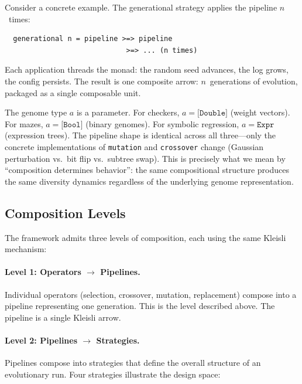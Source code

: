 \documentclass[sigconf,anonymous]{acmart}
\begin{document}
Consider a concrete example. The generational strategy applies the pipeline $n$~times:

\begin{verbatim}
  generational n = pipeline >=> pipeline
                             >=> ... (n times)
\end{verbatim}

\noindent Each application threads the monad: the random seed advances, the log grows, the config persists. The result is one composite arrow: $n$~generations of evolution, packaged as a single composable unit.

The genome type $a$ is a parameter. For checkers, $a = \texttt{[Double]}$ (weight vectors). For mazes, $a = \texttt{[Bool]}$ (binary genomes). For symbolic regression, $a = \texttt{Expr}$ (expression trees). The pipeline shape is identical across all three---only the concrete implementations of \texttt{mutation} and \texttt{crossover} change (Gaussian perturbation vs.\ bit flip vs.\ subtree swap). This is precisely what we mean by ``composition determines behavior'': the same compositional structure produces the same diversity dynamics regardless of the underlying genome representation.

\subsection{Composition Levels}

The framework admits three levels of composition, each using the same Kleisli mechanism:

\paragraph{Level 1: Operators $\to$ Pipelines.}
Individual operators (selection, crossover, mutation, replacement) compose into a pipeline representing one generation. This is the level described above. The pipeline is a single Kleisli arrow.

\paragraph{Level 2: Pipelines $\to$ Strategies.}
Pipelines compose into strategies that define the overall structure of an evolutionary run. Four strategies illustrate the design space:
\end{document}

